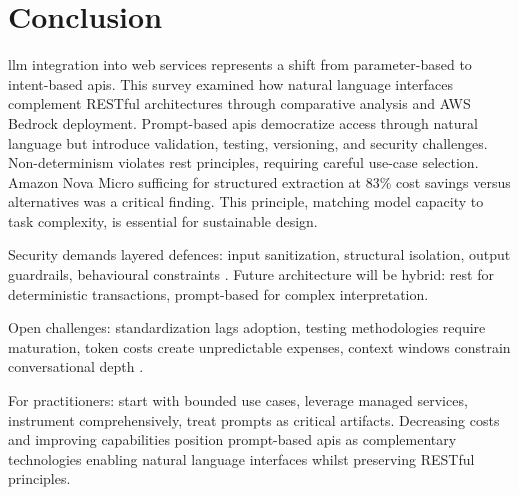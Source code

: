 \section{Conclusion}

\gls{llm} integration into web services represents a shift from parameter-based to intent-based \gls{api}s. This survey examined how natural language interfaces complement RESTful architectures through comparative analysis and AWS Bedrock deployment. Prompt-based \gls{api}s democratize access through natural language but introduce validation, testing, versioning, and security challenges. Non-determinism violates \gls{rest} principles, requiring careful use-case selection. Amazon Nova Micro sufficing for structured extraction at 83\% cost savings versus alternatives \cite{aws_nova_2025} was a critical finding. This principle, matching model capacity to task complexity, is essential for sustainable design.

Security demands layered defences: input sanitization, structural isolation, output guardrails, behavioural constraints \cite{owasp_top_2024, aws_bedrock_2025}. Future architecture will be hybrid: \gls{rest} for deterministic transactions, prompt-based for complex interpretation.

Open challenges: standardization lags adoption, testing methodologies require maturation, token costs create unpredictable expenses, context windows constrain conversational depth \cite{lercher_managing_2024, martinlopez_online_2022}.

For practitioners: start with bounded use cases, leverage managed services, instrument comprehensively, treat prompts as critical artifacts. Decreasing costs and improving capabilities position prompt-based \gls{api}s as complementary technologies enabling natural language interfaces whilst preserving RESTful principles.
